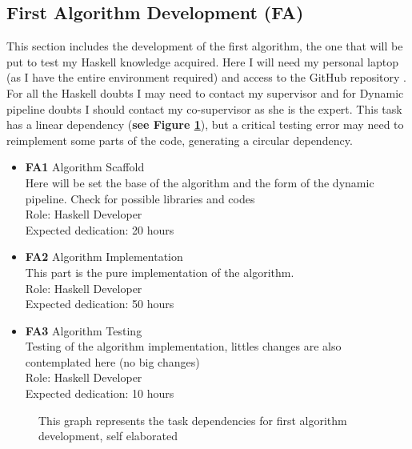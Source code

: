 \subsection{First Algorithm Development \textbf{(FA)}}
This section includes the development of the first algorithm, the one that will be put to test my Haskell knowledge acquired.
Here I will need my personal laptop (as I have the entire environment required) and access to the GitHub repository \cite{forner_gomez_incremental_nodate}.
For all the Haskell doubts I may need to contact my supervisor and for Dynamic pipeline doubts I should contact my co-supervisor as she is the expert.
This task has a linear dependency (\textbf{see Figure \ref{FA_dependences}}), but a critical testing error may need to reimplement some parts of the code, generating a circular dependency.
\begin{itemize}
    \item \textbf{FA1} Algorithm Scaffold \\
        Here will be set the base of the algorithm and the form of the dynamic pipeline.
        Check for possible libraries and codes \\
        Role: Haskell Developer\\
        Expected dedication: 20 hours
    \item \textbf{FA2} Algorithm Implementation\\
        This part is the pure implementation of the algorithm. \\
        Role: Haskell Developer \\
        Expected dedication: 50 hours
    \item \textbf{FA3} Algorithm Testing \\
        Testing of the algorithm implementation, littles changes are also contemplated here (no big changes) \\
        Role: Haskell Developer \\
        Expected dedication: 10 hours 
\end{itemize}
\begin{figure}[h]
    \centering
    \caption[{[Pla] TD for first algorithm development}]{This graph represents the task dependencies for first algorithm development, self elaborated}
    \label{FA_dependences}
\end{figure}

